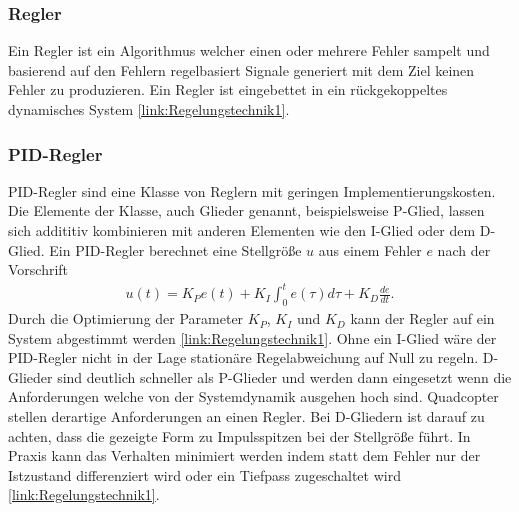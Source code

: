 \subsubsection{Regler}
Ein Regler ist ein Algorithmus welcher einen oder mehrere Fehler sampelt und basierend auf den Fehlern regelbasiert Signale generiert mit dem Ziel keinen Fehler zu produzieren. Ein Regler ist eingebettet in ein rückgekoppeltes dynamisches System \ref{link:Regelungstechnik1}.

\subsubsection{\label{pid:pid}PID-Regler}
PID-Regler sind eine Klasse von Reglern mit geringen Implementierungskosten.
Die Elemente der Klasse, auch Glieder genannt, beispielsweise P-Glied, lassen sich addititiv kombinieren mit anderen Elementen wie den I-Glied oder dem D-Glied.
Ein PID-Regler berechnet eine Stellgröße $u$ aus einem Fehler $e$ nach der Vorschrift
\label{pidregler}
\begin{align}
	u(t) = K_Pe(t) + K_I\int_0^t e(\tau)d\tau + K_D\frac{de}{dt}.
\end{align}
Durch die Optimierung der Parameter $K_P$, $K_I$ und $K_D$ kann der Regler auf ein System abgestimmt werden \ref{link:Regelungstechnik1}. Ohne ein I-Glied wäre der PID-Regler nicht in der Lage stationäre Regelabweichung auf Null zu regeln. D-Glieder sind deutlich schneller als P-Glieder und werden dann eingesetzt wenn die Anforderungen welche von der Systemdynamik ausgehen hoch sind. Quadcopter stellen derartige Anforderungen an einen Regler. Bei D-Gliedern ist darauf zu achten, dass die gezeigte Form zu Impulsspitzen bei der Stellgröße führt. In Praxis kann das Verhalten minimiert werden indem statt dem Fehler nur der Istzustand differenziert wird oder ein Tiefpass zugeschaltet wird \ref{link:Regelungstechnik1}. 

